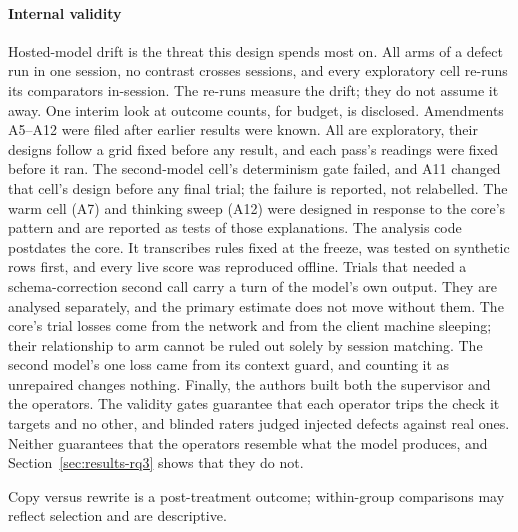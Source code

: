 \paragraph{Internal validity}
Hosted-model drift is the threat this design spends most on. All arms of a
defect run in one session, no contrast crosses sessions, and every exploratory
cell re-runs its comparators in-session. The re-runs measure the drift; they do
not assume it away. One interim look at outcome counts, for budget, is
disclosed. Amendments A5--A12 were filed after earlier results were known. All
are exploratory, their designs follow a grid fixed before any result, and each
pass's readings were fixed before it ran. The second-model cell's determinism
gate failed, and A11 changed that cell's design before any final trial; the
failure is reported, not relabelled. The warm cell (A7) and thinking sweep (A12)
were designed in response to the core's pattern and are reported as tests of
those explanations.
The analysis code postdates the core. It transcribes rules fixed at the freeze,
was tested on synthetic rows first, and every live score was reproduced
offline. Trials that needed a schema-correction second call carry a turn of the
model's own output. They are analysed separately, and the primary estimate does
not move without them. The core's trial losses come from the network and from
the client machine sleeping; their relationship to arm cannot be ruled out solely by session matching. The second model's
one loss came from its context guard, and counting it as unrepaired changes
nothing. Finally, the authors
built both the supervisor and the operators. The validity gates guarantee that
each operator trips the check it targets and no other, and blinded raters
judged injected defects against real ones. Neither guarantees that the
operators resemble what the model produces, and Section~\ref{sec:results-rq3}
shows that they do not.

Copy versus rewrite is a post-treatment outcome; within-group comparisons may reflect selection and are descriptive.

